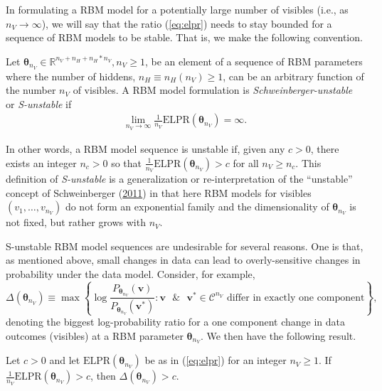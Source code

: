 \documentclass[12pt]{article}
\theoremstyle{definition}
\newcommand{\nv}{{n_{\scriptscriptstyle V}}}
\newcommand{\nh}{{n_{\scriptscriptstyle H}}}
\let\BeginKnitrBlock\begin \let\EndKnitrBlock\end
\begin{document}
In formulating a RBM model for a potentially large number of visibles
(i.e., as \(\nv \rightarrow \infty\)), we will say that the ratio
(\eqref{eq:elpr}) needs to stay bounded for a sequence of RBM models to be
stable. That is, we make the following convention.
\BeginKnitrBlock{definition}[S-unstable RBM]
\protect\hypertarget{def:unnamed-chunk-1}{}{\label{def:unnamed-chunk-1}
{} }Let
\(\boldsymbol \theta_\nv \in \mathbb{R}^{\nv + \nh + \nh*\nv}, \nv \ge 1\),
be an element of a sequence of RBM parameters where the number of
hiddens, \(\nh \equiv \nh(\nv) \ge 1\), can be an arbitrary function of
the number \(\nv\) of visibles. A RBM model formulation is
\emph{Schweinberger-unstable} or \emph{S-unstable} if
\begin{align*}
\lim\limits_{\nv \rightarrow \infty} \frac{1}{\nv} \text{ELPR}(\boldsymbol \theta_\nv) = \infty.
\end{align*}
\EndKnitrBlock{definition} In other words, a RBM model sequence is
unstable if, given any \(c > 0\), there exists an integer \(n_c > 0\) so
that \(\frac{1}{\nv}\text{ELPR}(\boldsymbol \theta_\nv) > c\) for all
\(\nv \ge n_c\). This definition of \emph{S-unstable} is a
generalization or re-interpretation of the ``unstable'' concept of
Schweinberger
(\protect\hyperlink{ref-schweinberger2011instability}{2011}) in that
here RBM models for visibles \((v_1, \dots, v_\nv)\) do not form an
exponential family and the dimensionality of \(\boldsymbol \theta_\nv\)
is not fixed, but rather grows with \(\nv\).

S-unstable RBM model sequences are undesirable for several reasons. One
is that, as mentioned above, small changes in data can lead to
overly-sensitive changes in probability under the data model. Consider,
for example, \[
\Delta(\boldsymbol \theta_\nv) \equiv \max \left\{\log \frac{P_{\boldsymbol \theta_\nv}(\boldsymbol v)}{P_{\boldsymbol \theta_\nv}(\boldsymbol v^*)} : \boldsymbol v \text{ }\& \text{ } \boldsymbol v^* \in \mathcal{C}^\nv \text{ differ in exactly one component}\right\},
\] denoting the biggest log-probability ratio for a one component change
in data outcomes (visibles) at a RBM parameter
\(\boldsymbol \theta_\nv\). We then have the following result.

\BeginKnitrBlock{proposition}
\protect\hypertarget{prp:instab1}{}{\label{prp:instab1}}Let \(c > 0\) and
let \(\text{ELPR}(\boldsymbol \theta_\nv)\) be as in (\eqref{eq:elpr}) for
an integer \(\nv \ge 1\). If
\(\frac{1}{\nv}\text{ELPR}(\boldsymbol \theta_\nv) > c\), then
\(\Delta(\boldsymbol \theta_\nv) > c\).
\EndKnitrBlock{proposition}
\end{document}
